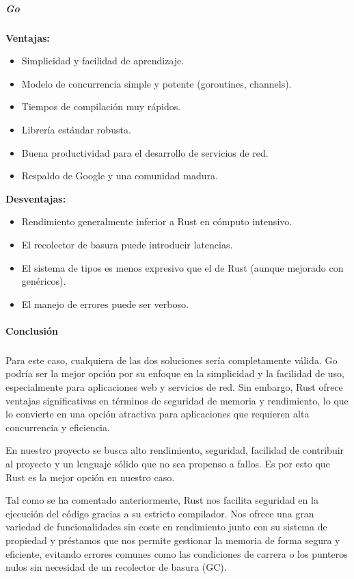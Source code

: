 \subparagraph{Go}
\textbf{Ventajas:}
\begin{itemize}
    \item Simplicidad y facilidad de aprendizaje.
    \item Modelo de concurrencia simple y potente (goroutines, channels).
    \item Tiempos de compilación muy rápidos.
    \item Librería estándar robusta.
    \item Buena productividad para el desarrollo de servicios de red.
    \item Respaldo de Google y una comunidad madura.
\end{itemize}
\textbf{Desventajas:}
\begin{itemize}
    \item Rendimiento generalmente inferior a Rust en cómputo intensivo.
    \item El recolector de basura puede introducir latencias.
    \item El sistema de tipos es menos expresivo que el de Rust (aunque mejorado con genéricos).
    \item El manejo de errores puede ser verboso.
\end{itemize}

\paragraph{Conclusión}
\subparagraph{}
Para este caso, cualquiera de las dos soluciones sería completamente válida. Go podría ser la mejor opción por su enfoque en la simplicidad y la facilidad de uso, especialmente para aplicaciones web y servicios de red. Sin embargo, Rust ofrece ventajas significativas en términos de seguridad de memoria y rendimiento, lo que lo convierte en una opción atractiva para aplicaciones que requieren alta concurrencia y eficiencia.

En nuestro proyecto se busca alto rendimiento, seguridad, facilidad de contribuir al proyecto y un lenguaje sólido que no sea propenso a fallos.
Es por esto que Rust es la mejor opción en nuestro caso.

Tal como se ha comentado anteriormente, Rust nos facilita seguridad en la ejecución del código gracias a su estricto compilador.
Nos ofrece una gran variedad de funcionalidades sin coste en rendimiento junto con su sistema de propiedad y préstamos que nos permite gestionar la memoria de forma segura y eficiente, evitando errores comunes como las condiciones de carrera o los punteros nulos sin necesidad de un recolector de basura (GC).

